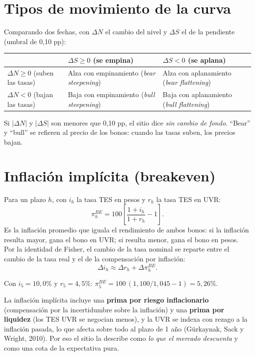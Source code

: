 \section{Tipos de movimiento de la curva}
Comparando dos fechas, con $\Delta N$ el cambio del nivel y $\Delta S$ el de la pendiente (umbral de 0,10 pp):
\begin{center}\small
\begin{tabular}{@{}lll@{}}
\toprule
 & $\Delta S\ge0$ (se empina) & $\Delta S<0$ (se aplana)\\\midrule
$\Delta N\ge0$ (suben las tasas) & Alza con empinamiento (\emph{bear steepening}) & Alza con aplanamiento (\emph{bear flattening})\\
$\Delta N<0$ (bajan las tasas) & Baja con empinamiento (\emph{bull steepening}) & Baja con aplanamiento (\emph{bull flattening})\\
\bottomrule
\end{tabular}
\end{center}
Si $|\Delta N|$ y $|\Delta S|$ son menores que 0,10 pp, el sitio dice \emph{sin cambio de fondo}. ``Bear'' y ``bull''
se refieren al precio de los bonos: cuando las tasas suben, los precios bajan.

\section{Inflación implícita (breakeven)}
\label{es:f:breakeven}
Para un plazo $h$, con $i_h$ la tasa TES en pesos y $r_h$ la tasa TES en UVR:
\[
\pi^{BE}_h=100\left[\frac{1+i_h}{1+r_h}-1\right].
\]
Es la inflación promedio que iguala el rendimiento de ambos bonos: si la inflación resulta mayor, gana el bono en UVR;
si resulta menor, gana el bono en pesos. Por la identidad de Fisher, el cambio de la tasa nominal se reparte entre el
cambio de la tasa real y el de la compensación por inflación:
\[
\Delta i_h\approx\Delta r_h+\Delta\pi^{BE}_h .
\]

\begin{dato}
Con $i_5=10{,}0\%$ y $r_5=4{,}5\%$: $\pi^{BE}_5=100\,(1{,}100/1{,}045-1)=5{,}26\%$.
\end{dato}

\begin{alerta}
La inflación implícita incluye una \textbf{prima por riesgo inflacionario} (compensación por la incertidumbre sobre
la inflación) y una \textbf{prima por liquidez} (los TES UVR se negocian menos), y la UVR se indexa con rezago a la
inflación pasada, lo que afecta sobre todo al plazo de 1 año (Gürkaynak, Sack y Wright, 2010). Por eso el sitio la
describe como \emph{lo que el mercado descuenta} y como una cota de la expectativa pura.
\end{alerta}

